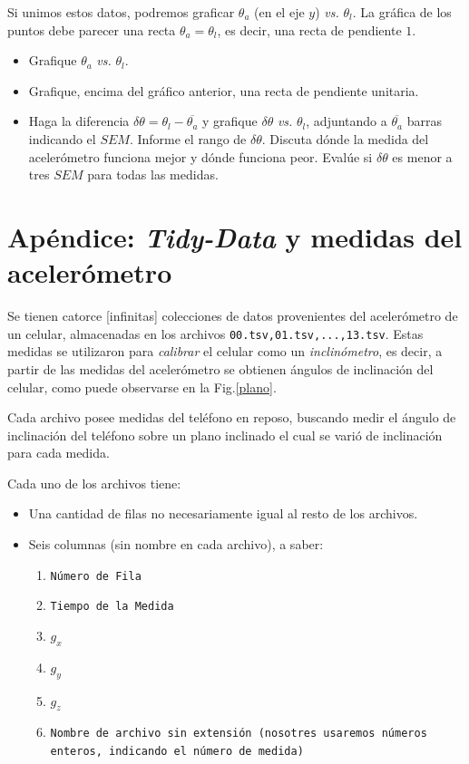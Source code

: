 \documentclass[10pt,a4paper]{article}
\theoremstyle{definition}
\begin{document}
Si unimos estos datos, podremos graficar $\theta_{a}$ (en el eje $y$) \textit{vs.} $\theta_l$. La gráfica de los puntos debe parecer una recta $\theta_{a} = \theta_l$, es decir, una recta de pendiente $1$.

\begin{itemize}
\item[$\bullet$] Grafique $\theta_{a}$ \textit{vs.} $\theta_l$.
\item[$\bullet$] Grafique, encima del gráfico anterior, una recta de pendiente unitaria.
\item[$\bullet$] Haga la diferencia $\delta \theta = \theta_l - \overline{\theta_{a}}$ y grafique $\delta \theta$ \textit{vs.} $\theta_l$, adjuntando a $\overline{\theta_a}$ barras indicando el $SEM$. Informe el rango de $\delta \theta$. Discuta dónde la medida del acelerómetro funciona mejor y dónde funciona peor. Evalúe si $\delta \theta$ es menor a tres $SEM$ para todas las medidas. 
\end{itemize}



\pagebreak

\section*{Apéndice: \textit{Tidy-Data} y medidas del acelerómetro}


Se tienen catorce [infinitas] colecciones de datos provenientes del acelerómetro de un celular, almacenadas en los archivos \texttt{00.tsv,01.tsv,...,13.tsv}. Estas medidas se utilizaron para \textit{calibrar} el celular como un \textit{inclinómetro}, es decir, a partir de las medidas del acelerómetro se obtienen ángulos de inclinación del celular, como puede observarse en la Fig.\eqref{plano}.


Cada archivo posee medidas del teléfono en reposo, buscando medir el ángulo de inclinación del teléfono sobre un plano inclinado el cual se varió de inclinación para cada medida. 

Cada uno de los archivos tiene:

\begin{itemize}
\item[$\bullet$] Una cantidad de filas no necesariamente igual al resto de los archivos.
\item[$\bullet$] Seis columnas (sin nombre en cada archivo), a saber:
\begin{enumerate}
\item \texttt{Número de Fila}
\item \texttt{Tiempo de la Medida}
\item \texttt{$g_x$}
\item \texttt{$g_y$}
\item \texttt{$g_z$}
\item \texttt{Nombre de archivo sin extensión (nosotres usaremos números enteros, indicando el número de medida)} 
\end{enumerate}
\end{itemize}
\end{document}
